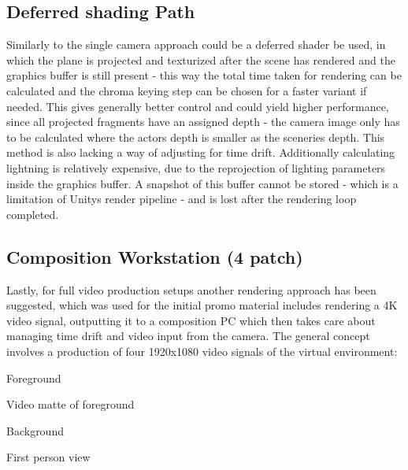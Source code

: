 \subsection{Deferred shading Path}

Similarly to the single camera approach could be a deferred shader be used, in 
which the plane is projected and texturized after the scene has rendered and 
the graphics buffer is still present - this way the total time taken for 
rendering can be calculated and the chroma keying step can be chosen for a 
faster variant if needed. This gives generally better control and could yield 
higher performance, since all projected fragments have an assigned depth - the 
camera image only has to be calculated where the actors depth is smaller as the 
sceneries depth. This method is also lacking a way of adjusting for time drift. 
Additionally calculating lightning is relatively expensive, due to the 
reprojection of lighting parameters inside the graphics buffer. A snapshot of 
this buffer cannot be stored - which is a limitation of Unitys render pipeline 
- and is lost after the rendering loop completed.

\subsection{Composition Workstation (4 patch)}

Lastly, for full video production setups another rendering approach has been 
suggested, which was used for the initial promo material 
\cite{valve:vive-trailer:2016} includes rendering a 4K video signal, outputting 
it to a composition PC which then takes care about managing time drift and 
video input from the camera.
\newline
The general concept involves a production of four 1920x1080 video signals of 
the virtual environment:
\begin{my_list}
	\item Foreground
	\item Video matte of foreground
	\item Background
	\item First person view
\end{my_list}

